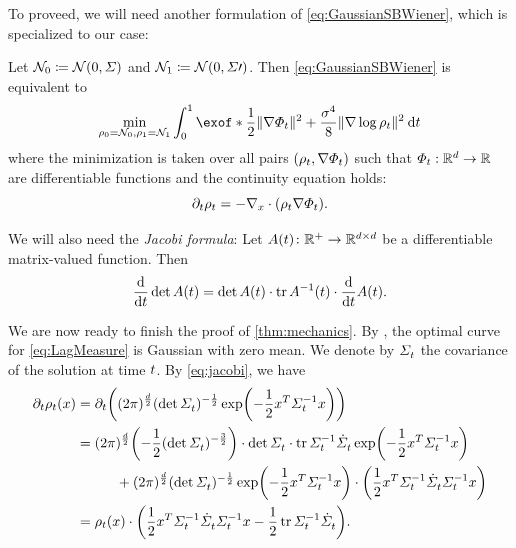 To proveed, we will need another formulation of \eqref{eq:GaussianSBWiener}, which is \citep{chen2016relation, gentil2017analogy} specialized to our case: 
\begin{lemma}\label{lem:EntOT}
Let $\mathcal{N}_0 \coloneqq \mathcal{N}(0,\Sigma)$ and $\mathcal{N}_1 \coloneqq \mathcal{N}(0,\Sigma\prime)$. Then \eqref{eq:GaussianSBWiener} is equivalent to
\begin{align}
\label{eq:LagMeasure}
\min_{\ssstyle\substack{{\measure[0] = \Ninit, \measure[\horizon] = \Nend}}} \int_{0}^\horizon  \exof*{\frac{1}{2} \norm{\vecsol}^2 + \frac{\sdev^4}{8} \norm{ \nabla \log \measure }^2} \dt
\end{align}where the minimization is taken over all pairs $(\rho_{t}, \nabla\Phi_{t})$ such that $\Phi_t:\mathbb{R}^d\to\mathbb{R}$ are differentiable functions and the continuity equation holds:
\begin{equation}
\label{eq:ConeqApp}
\partial_{t}\rho_{t} = - \nabla_{ {x} } \cdot(\rho_{t} \nabla\Phi_{t}).
\end{equation}
\end{lemma}

We will also need the \emph{Jacobi formula}: Let $A(t) \colon \mathbb{R}^+ \to \mathbb{R}^{d\times d} $ be a differentiable matrix-valued function. Then
\begin{align}
\label{eq:jacobi}
\frac{\mathrm{d}}{\mathrm{d}t} \det A(t) = \det A(t) \cdot \operatorname{tr} A^{-1}(t) \cdot \frac{\mathrm{d}}{\mathrm{d}t} A(t).
\end{align}

We are now ready to finish the proof of \cref{thm:mechanics}. By \citet{leonard2013survey}, the optimal curve for \eqref{eq:LagMeasure} is Gaussian with zero mean. We denote by $\Sigma^{}_{ t }$ the covariance of the solution at time $t$. By \eqref{eq:jacobi}, we have
\begin{align}
\nn
\pt\measure(\point) &= \pt \parens*{ \nconst (\det\Sigmasol)^{-\frac{1}{2}} \exp\parens*{ -\frac{1}{2}\point^T  \Sigmasolinv\point   }}  \\
\nn
&=   \nconst \parens*{-\frac{1}{2} (\det\Sigmasol)^{-\frac{3}{2}}}  
\cdot\det\Sigmasol\cdot \tr \Sigmasolinv \dSigmasol \exp\parens*{ -\frac{1}{2}\point^T  \Sigmasolinv\point   } \\
\nn
&\hspace{10mm}+ \nconst (\det\Sigmasol)^{-\frac{1}{2}} \exp\parens*{ -\frac{1}{2}\point^T  \Sigmasolinv\point   } \cdot \parens*{\frac{1}{2} \point^T  \Sigmasolinv \dSigmasol \Sigmasolinv \point} \\
\label{eq:pt-m}
&= \measure(\point) \cdot \parens*{ \frac{1}{2} \point^T  \Sigmasolinv \dSigmasol \Sigmasolinv \point -\frac{1}{2}\tr \Sigmasolinv \dSigmasol }.
\end{align}


